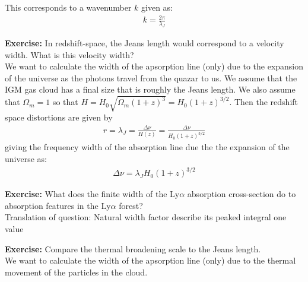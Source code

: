 \documentclass[paper=a4, fontsize=11pt]{scrartcl} %
\numberwithin{figure}{section} %
\numberwithin{table}{section} %
\begin{document}
This corresponds to a wavenumber $k$ given as:
\begin{align*}
k = \frac{2\pi}{\lambda_J}
\end{align*}

\textbf{Exercise:} In redshift-space, the Jeans length would correspond to a velocity width. What is this velocity width?\\

We want to calculate the width of the apsorption line (only) due to the expansion of the universe as the photons travel from the quazar to us. We assume that the IGM gas cloud has a final size that is roughly the Jeans length. We also assume that $\Omega_m = 1$ so that $H = H_0 \sqrt{\Omega_m(1+z)^3} = H_0 (1+z)^{3/2}$. Then the redshift space distortions are given by 
\begin{align*}
r = \lambda_J = \frac{\Delta \nu}{H(z)} = \frac{\Delta \nu}{H_0 (1+z)^{3/2}}
\end{align*}
giving the frequency width of the absorption line due the the expansion of the universe as:
\begin{align*}
\Delta \nu = \lambda_J H_0 (1+z)^{3/2}
\end{align*} 
 

\textbf{Exercise:} What does the finite width of the Ly$\alpha$ absorption cross-section do to absorption features in the Ly$\alpha$ forest? \\

Translation of question:
Natural width factor
describe 
its peaked
integral one value

\textbf{Exercise:} Compare the thermal broadening scale to the Jeans length. \\

We want to calculate the width of the apsorption line (only) due to the thermal movement of the particles in the cloud.






\end{document}
